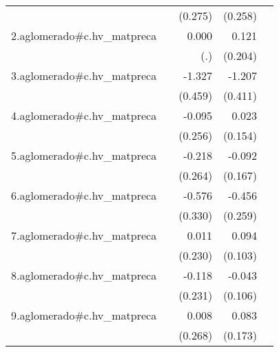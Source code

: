 {\begin{longtable}{l*{4}{D{.}{.}{-1}}}
            &                     &     (0.275)         &     (0.258)         &                     \\
\addlinespace
2.aglomerado#c.hv\_matpreca&                     &       0.000         &       0.121         &                     \\
            &                     &         (.)         &     (0.204)         &                     \\
\addlinespace
3.aglomerado#c.hv\_matpreca&                     &      -1.327\sym{**} &      -1.207\sym{**} &                     \\
            &                     &     (0.459)         &     (0.411)         &                     \\
\addlinespace
4.aglomerado#c.hv\_matpreca&                     &      -0.095         &       0.023         &                     \\
            &                     &     (0.256)         &     (0.154)         &                     \\
\addlinespace
5.aglomerado#c.hv\_matpreca&                     &      -0.218         &      -0.092         &                     \\
            &                     &     (0.264)         &     (0.167)         &                     \\
\addlinespace
6.aglomerado#c.hv\_matpreca&                     &      -0.576         &      -0.456         &                     \\
            &                     &     (0.330)         &     (0.259)         &                     \\
\addlinespace
7.aglomerado#c.hv\_matpreca&                     &       0.011         &       0.094         &                     \\
            &                     &     (0.230)         &     (0.103)         &                     \\
\addlinespace
8.aglomerado#c.hv\_matpreca&                     &      -0.118         &      -0.043         &                     \\
            &                     &     (0.231)         &     (0.106)         &                     \\
\addlinespace
9.aglomerado#c.hv\_matpreca&                     &       0.008         &       0.083         &                     \\
            &                     &     (0.268)         &     (0.173)         &                     \\

\end{longtable}}
